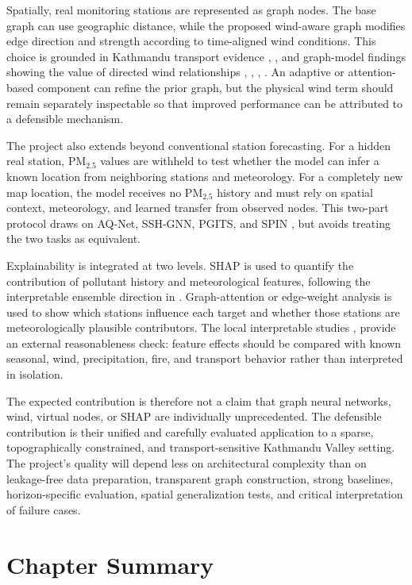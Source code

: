Spatially, real monitoring stations are represented as graph nodes. The base graph can use geographic distance, while the proposed wind-aware graph modifies edge direction and strength according to time-aligned wind conditions. This choice is grounded in Kathmandu transport evidence \cite{ref6}, \cite{ref7}, \cite{ref10} and graph-model findings showing the value of directed wind relationships \cite{ref14}, \cite{ref15}, \cite{ref17}, \cite{ref25}. An adaptive or attention-based component can refine the prior graph, but the physical wind term should remain separately inspectable so that improved performance can be attributed to a defensible mechanism.

The project also extends beyond conventional station forecasting. For a hidden real station, PM$_{2.5}$ values are withheld to test whether the model can infer a known location from neighboring stations and meteorology. For a completely new map location, the model receives no PM$_{2.5}$ history and must rely on spatial context, meteorology, and learned transfer from observed nodes. This two-part protocol draws on AQ-Net, SSH-GNN, PGITS, and SPIN \cite{ref28}, \cite{ref30,ref31,ref32} but avoids treating the two tasks as equivalent.

Explainability is integrated at two levels. SHAP is used to quantify the contribution of pollutant history and meteorological features, following the interpretable ensemble direction in \cite{ref12}. Graph-attention or edge-weight analysis is used to show which stations influence each target and whether those stations are meteorologically plausible contributors. The local interpretable studies \cite{ref5}, \cite{ref7} provide an external reasonableness check: feature effects should be compared with known seasonal, wind, precipitation, fire, and transport behavior rather than interpreted in isolation.

The expected contribution is therefore not a claim that graph neural networks, wind, virtual nodes, or SHAP are individually unprecedented. The defensible contribution is their unified and carefully evaluated application to a sparse, topographically constrained, and transport-sensitive Kathmandu Valley setting. The project's quality will depend less on architectural complexity than on leakage-free data preparation, transparent graph construction, strong baselines, horizon-specific evaluation, spatial generalization tests, and critical interpretation of failure cases.

\section{Chapter Summary}

